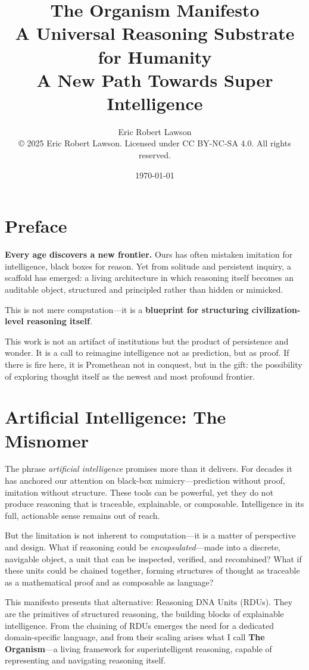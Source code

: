 \documentclass[12pt]{article}
\title{\textbf{The Organism Manifesto} \\[0.5em]
A Universal Reasoning Substrate for Humanity \\[0.3em]
A New Path Towards Super Intelligence}
\author{
Eric Robert Lawson \\
\vspace{0.5em}
\small{© 2025 Eric Robert Lawson. Licensed under CC BY-NC-SA 4.0. All rights reserved.}
}
\date{\today}
\begin{document}
\maketitle
\thispagestyle{empty}
\newpage

\tableofcontents
\newpage

\section*{Preface}

\noindent \textbf{Every age discovers a new frontier.} Ours has often mistaken imitation for intelligence, black boxes for reason. Yet from solitude and persistent inquiry, a scaffold has emerged: a living architecture in which reasoning itself becomes an auditable object, structured and principled rather than hidden or mimicked.

This is not mere computation---it is a \textbf{blueprint for structuring civilization-level reasoning itself}.  

This work is not an artifact of institutions but the product of persistence and wonder. It is a call to reimagine intelligence not as prediction, but as proof. If there is fire here, it is Promethean not in conquest, but in the gift: the possibility of exploring thought itself as the newest and most profound frontier.


\section{Artificial Intelligence: The Misnomer}

The phrase \textit{artificial intelligence} promises more than it delivers. For decades it has anchored our attention on black-box mimicry—prediction without proof, imitation without structure. These tools can be powerful, yet they do not produce reasoning that is traceable, explainable, or composable. Intelligence in its full, actionable sense remains out of reach.  

But the limitation is not inherent to computation—it is a matter of perspective and design. What if reasoning could be \textit{encapsulated}—made into a discrete, navigable object, a unit that can be inspected, verified, and recombined? What if these units could be chained together, forming structures of thought as traceable as a mathematical proof and as composable as language?  

This manifesto presents that alternative: Reasoning DNA Units (RDUs). They are the primitives of structured reasoning, the building blocks of explainable intelligence. From the chaining of RDUs emerges the need for a dedicated domain-specific language, and from their scaling arises what I call \textbf{The Organism}—a living framework for superintelligent reasoning, capable of representing and navigating reasoning itself.
\end{document}
